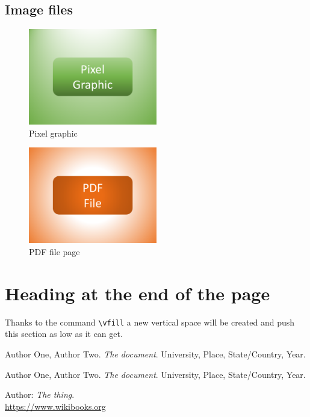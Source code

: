 \documentclass{article}				%
\begin{document}


\subsection{Image files}

\begin{figure}[ht]
	\centering
	\includegraphics[width=0.5\textwidth]{example-resource-pixel-graphic.png}
	\caption{Pixel graphic}
	\label{fig:pixelGraphic}
\end{figure}

\begin{figure}[ht]
	\centering
	\includegraphics[width=0.5\textwidth]{example-resource-pdf-file.pdf}
	\caption{PDF file page}
	\label{fig:pdfFile}
\end{figure}

\vfill

\section{Heading at the end of the page}

Thanks to the command \verb|\vfill| a new vertical space will be created and push this section as low as it can get.

\newpage

\begin{thebibliography}{3} %
	
	Author One, Author Two.
	\textit{The document}. 
	University, Place, State/Country, Year.
	
	Author One, Author Two.
	\textit{The document}. 
	University, Place, State/Country, Year.
	
	Author: \textit{The thing}. 
	\\\url{https://www.wikibooks.org}
	
\end{thebibliography}

\end{document}
